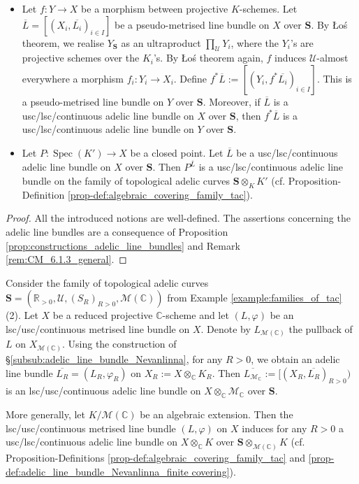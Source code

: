 \documentclass [11pt,reqno]{amsart}
\def\bC{{\mathbb{C}}}
\def\bR{{\mathbb{R}}}
\newcommand{\1}{\mathmybb{1}}
\def\cM{{\mathcal{M}}}
\def\cU{{\mathcal{U}}}
\def\Spec{\operatorname{Spec}}
\begin{document}
\begin{proposition-definition}
\begin{itemize}
	\item[(6)] Let $f:Y\to X$ be a morphism between projective $K$-schemes. Let $\overline{L}=[(X_{i},\overline{L_{i}})_{i\in I}]$ be a pseudo-metrised line bundle on $X$ over $\mathbf{S}$. By \L{}o\'s theorem, we realise $Y_{\mathbf{S}}$ as an ultraproduct $\prod_{\cU}Y_{i}$, where the $Y_{i}$'s are projective schemes over the $K_{i}$'s. By \L{}o\'s theorem again, $f$ induces $\cU$-almost everywhere a morphism $f_{i}:Y_{i}\to X_{i}$. Define $f^{\ast}\overline{L}:=[(Y_{i},f^{\ast}\overline{L_{i}})_{i\in I}]$. This is a pseudo-metrised line bundle on $Y$ over $\mathbf{S}$. Moreover, if $\overline{L}$ is a usc/lsc/continuous adelic line bundle on $X$ over $\mathbf{S}$, then $f^{\ast}\overline{L}$ is a usc/lsc/continuous adelic line bundle on $Y$ over $\mathbf{S}$.
	\item[(7)] Let $P:\Spec(K')\to X$ be a closed point. Let $\overline{L}$ be a usc/lsc/continuous adelic line bundle on $X$ over $\mathbf{S}$. Then $P^{\overline{L}}$ is a usc/lsc/continuous adelic line bundle on the family of topological adelic curves $\mathbf{S}\otimes_{K}K'$ (cf. Proposition-Definition \ref{prop-def:algebraic_covering_family_tac}).
\end{itemize}
\end{proposition-definition}

\begin{proof}
All the introduced notions are well-defined. The assertions concerning the adelic line bundles are a consequence of Proposition \ref{prop:constructions_adelic_line_bundles} and Remark \ref{rem:CM_6.1.3_general}.
\end{proof}

\begin{example}
\label{example:adelic_line_bundle_Nevanlinna_family}
Consider the family of topological adelic curves $\mathbf{S}=(\bR_{>0},\cU,(S_{R})_{R>0},\cM(\bC))$ from Example \ref{example:families_of_tac} (2). Let $X$ be a reduced projective $\bC$-scheme and let $(L,\varphi)$ be an lsc/usc/continuous metrised line bundle on $X$. Denote by $L_{\cM(\bC)}$ the pullback of $L$ on $X_{\cM(\bC)}$. Using the construction of \S \ref{subsub:adelic_line_bundle_Nevanlinna}, for any $R>0$, we obtain an adelic line bundle $\overline{L_{R}}=(L_{R},\varphi_{R})$ on $X_{R}:=X \otimes_{\bC} K_{R}$. Then $\overline{L_{\cM_{\bC}}}:=[(X_{R},\overline{L_{R}})_{R>0})$ is an lsc/usc/continuous adelic line bundle on $X\otimes_{\bC}\cM_{\bC}$ over $\mathbf{S}$.

More generally, let $K/\cM(\bC)$ be an algebraic extension. Then the lsc/usc/continuous metrised line bundle $(L,\varphi)$ on $X$ induces for any $R>0$ a usc/lsc/continuous adelic line bundle on $X\otimes_{\bC}K$ over $\mathbf{S}\otimes_{\cM(\bC)}K$ (cf. Proposition-Definitions \ref{prop-def:algebraic_covering_family_tac} and \ref{prop-def:adelic_line_bundle_Nevanlinna_finite covering}).
\end{example}
\end{document}
